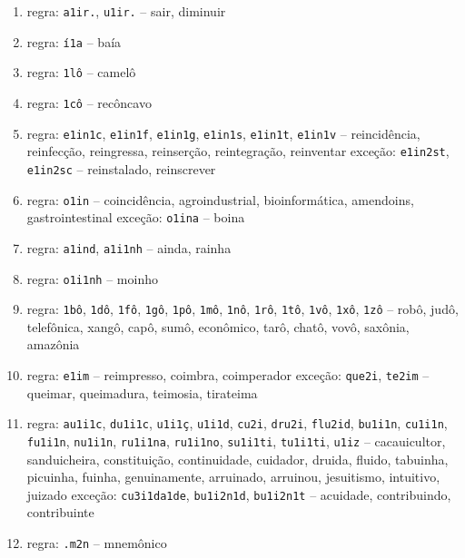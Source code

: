 \documentclass{article}
\begin{document}
\begin{enumerate}
\item regra: \texttt{a1ir.}, \texttt{u1ir.} -- sair, diminuir

\item regra: \texttt{í1a} -- baía

\item regra: \texttt{1lô} -- camelô

\item regra: \texttt{1cô} -- recôncavo

\item regra: \texttt{e1in1c}, \texttt{e1in1f}, \texttt{e1in1g}, \texttt{e1in1s}, \texttt{e1in1t}, \texttt{e1in1v} -- reincidência, reinfecção, reingressa, reinserção, reintegração, reinventar
exceção: \texttt{e1in2st}, \texttt{e1in2sc} -- reinstalado, reinscrever 

\item regra: \texttt{o1in} -- coincidência, agroindustrial, bioinformática, amendoins, gastrointestinal
exceção: \texttt{o1ina} -- boina

\item regra: \texttt{a1ind}, \texttt{a1i1nh} -- ainda, rainha

\item regra: \texttt{o1i1nh} -- moinho

\item regra: \texttt{1bô}, \texttt{1dô}, \texttt{1fô}, \texttt{1gô}, \texttt{1pô}, \texttt{1mô}, \texttt{1nô}, \texttt{1rô}, \texttt{1tô}, \texttt{1vô}, \texttt{1xô}, \texttt{1zô} -- robô, judô,  telefônica, xangô, capô, sumô, econômico, tarô, chatô, vovô, saxônia, amazônia

\item regra: \texttt{e1im} -- reimpresso, coimbra, coimperador
exceção: \texttt{que2i}, \texttt{te2im} -- queimar, queimadura, teimosia, tirateima

\item regra: \texttt{au1i1c}, \texttt{du1i1c}, \texttt{u1i1ç}, \texttt{u1i1d}, \texttt{cu2i}, \texttt{dru2i}, \texttt{flu2id}, \texttt{bu1i1n}, \texttt{cu1i1n}, \texttt{fu1i1n}, \texttt{nu1i1n}, \texttt{ru1i1na}, \texttt{ru1i1no}, \texttt{su1i1ti}, \texttt{tu1i1ti}, \texttt{u1iz} -- cacauicultor, sanduicheira, constituição, continuidade, cuidador, druida, fluido, tabuinha, picuinha, fuinha, genuinamente, arruinado, arruinou, jesuitismo, intuitivo, juizado 
exceção: \texttt{cu3i1da1de}, \texttt{bu1i2n1d}, \texttt{bu1i2n1t}  -- acuidade, contribuindo, contribuinte

\item regra: \texttt{.m2n} -- mnemônico


\end{enumerate}
\end{document}

